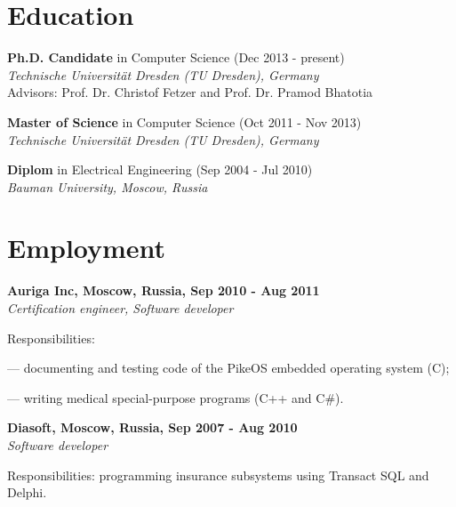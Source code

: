 \documentclass[letterpaper]{article}
\renewenvironment{itemize}{
  \begin{list}{}{
    \setlength{\leftmargin}{1.5em}
  }
}{
  \end{list}
}
\begin{document}
\section*{Education}

\begin{itemize}

 \item \textbf{Ph.D. Candidate} in Computer Science (Dec 2013 - present)\\
 {\em  Technische Universit{\"a}t Dresden (TU Dresden), Germany}\\
Advisors: Prof. Dr. Christof Fetzer and Prof. Dr. Pramod Bhatotia

 \item \textbf{Master of Science} in Computer Science (Oct 2011 - Nov 2013) \\
 {\em  Technische Universit{\"a}t Dresden (TU Dresden), Germany}


\item \textbf{Diplom} in Electrical Engineering (Sep 2004 - Jul 2010)\\
  {\em Bauman University, Moscow, Russia} 

\end{itemize}



\section*{Employment}

{\bf Auriga Inc, Moscow, Russia, Sep 2010 - Aug 2011}\\
{\em Certification engineer, Software developer}
\begin{itemize}
	\item Responsibilities:
		\begin{itemize}
		\item --- documenting and testing code of the PikeOS embedded operating system (C);
		\item --- writing medical special-purpose programs (C++ and C\#).
		\end{itemize}
	\item 
\end{itemize}

{\bf Diasoft, Moscow, Russia, Sep 2007 - Aug 2010}\\
{\em Software developer}
\begin{itemize}
	\item Responsibilities: programming insurance subsystems using Transact SQL and Delphi.
\end{itemize}
\end{document}
